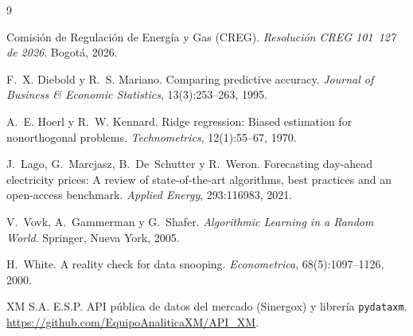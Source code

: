 \documentclass[11pt,letterpaper]{article}
\begin{document}
\begin{thebibliography}{9}

Comisión de Regulación de Energía y Gas (CREG).
\newblock \emph{Resolución CREG 101~127 de 2026}.
\newblock Bogotá, 2026.

F.~X. Diebold y R.~S. Mariano.
\newblock Comparing predictive accuracy.
\newblock \emph{Journal of Business \& Economic Statistics}, 13(3):253--263,
  1995.

A.~E. Hoerl y R.~W. Kennard.
\newblock Ridge regression: Biased estimation for nonorthogonal problems.
\newblock \emph{Technometrics}, 12(1):55--67, 1970.

J.~Lago, G.~Marcjasz, B.~De~Schutter y R.~Weron.
\newblock Forecasting day-ahead electricity prices: A review of
  state-of-the-art algorithms, best practices and an open-access benchmark.
\newblock \emph{Applied Energy}, 293:116983, 2021.

V.~Vovk, A.~Gammerman y G.~Shafer.
\newblock \emph{Algorithmic Learning in a Random World}.
\newblock Springer, Nueva York, 2005.

H.~White.
\newblock A reality check for data snooping.
\newblock \emph{Econometrica}, 68(5):1097--1126, 2000.

XM S.A. E.S.P.
\newblock API pública de datos del mercado (Sinergox) y librería
  \texttt{pydataxm}.
\newblock \url{https://github.com/EquipoAnaliticaXM/API_XM}.

\end{thebibliography}
\end{document}
